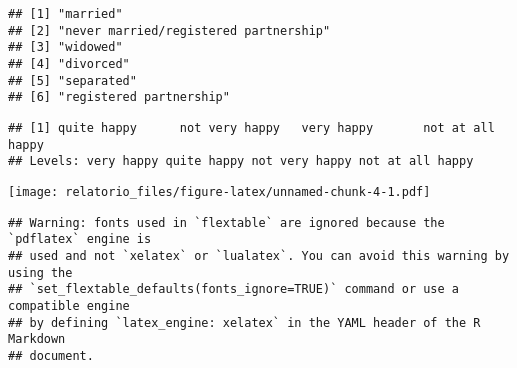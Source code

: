 \documentclass[
]{article}
\newenvironment{Shaded}{\begin{snugshade}}{\end{snugshade}}
\newcommand{\AttributeTok}[1]{\textcolor[rgb]{0.13,0.29,0.53}{#1}}
\newcommand{\CommentTok}[1]{\textcolor[rgb]{0.56,0.35,0.01}{\textit{#1}}}
\newcommand{\FunctionTok}[1]{\textcolor[rgb]{0.13,0.29,0.53}{\textbf{#1}}}
\newcommand{\NormalTok}[1]{#1}
\newcommand{\OtherTok}[1]{\textcolor[rgb]{0.56,0.35,0.01}{#1}}
\newcommand{\SpecialCharTok}[1]{\textcolor[rgb]{0.81,0.36,0.00}{\textbf{#1}}}
\newcommand{\StringTok}[1]{\textcolor[rgb]{0.31,0.60,0.02}{#1}}
\begin{document}
\begin{verbatim}
## [1] "married"                             
## [2] "never married/registered partnership"
## [3] "widowed"                             
## [4] "divorced"                            
## [5] "separated"                           
## [6] "registered partnership"
\end{verbatim}

\begin{verbatim}
## [1] quite happy      not very happy   very happy       not at all happy
## Levels: very happy quite happy not very happy not at all happy
\end{verbatim}

\begin{Shaded}
\end{Shaded}

\texttt{[image: relatorio\_files/figure-latex/unnamed-chunk-4-1.pdf]}

\begin{Shaded}
\end{Shaded}

\begin{verbatim}
## Warning: fonts used in `flextable` are ignored because the `pdflatex` engine is
## used and not `xelatex` or `lualatex`. You can avoid this warning by using the
## `set_flextable_defaults(fonts_ignore=TRUE)` command or use a compatible engine
## by defining `latex_engine: xelatex` in the YAML header of the R Markdown
## document.
\end{verbatim}
\end{document}

